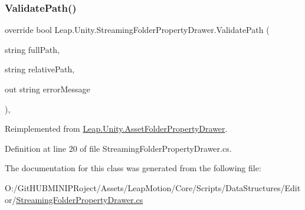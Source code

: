 \subsubsection{\texorpdfstring{ValidatePath()}{ValidatePath()}}
{\footnotesize\ttfamily override bool Leap.\+Unity.\+Streaming\+Folder\+Property\+Drawer.\+Validate\+Path (\begin{DoxyParamCaption}\item[{string}]{full\+Path,  }\item[{string}]{relative\+Path,  }\item[{out string}]{error\+Message }\end{DoxyParamCaption})\hspace{0.3cm}{\ttfamily [protected]}, {\ttfamily [virtual]}}



Reimplemented from \mbox{\hyperlink{class_leap_1_1_unity_1_1_asset_folder_property_drawer_a758121df1db1aa0c8e81154f239297a6}{Leap.\+Unity.\+Asset\+Folder\+Property\+Drawer}}.



Definition at line 20 of file Streaming\+Folder\+Property\+Drawer.\+cs.



The documentation for this class was generated from the following file\+:\begin{DoxyCompactItemize}
\item 
O\+:/\+Git\+H\+U\+B\+M\+I\+N\+I\+P\+Roject/\+Assets/\+Leap\+Motion/\+Core/\+Scripts/\+Data\+Structures/\+Editor/\mbox{\hyperlink{_streaming_folder_property_drawer_8cs}{Streaming\+Folder\+Property\+Drawer.\+cs}}\end{DoxyCompactItemize}
